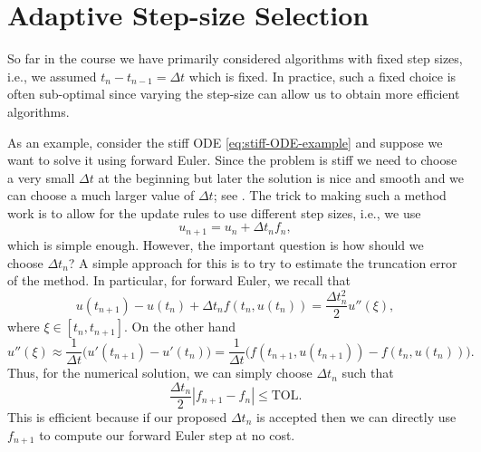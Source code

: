 \chapter{Adaptive Step-size Selection}

So far in the course we have primarily considered algorithms with 
fixed step sizes, i.e., we assumed $t_{n} - t_{n-1} = \Delta t$ 
which is fixed. In practice, such a fixed choice is often sub-optimal 
since varying the step-size can allow us to obtain more 
efficient algorithms. 

As an example, consider the stiff ODE \eqref{eq:stiff-ODE-example}
and suppose we want to solve it using forward Euler. Since the problem 
is stiff we need to choose a very small $\Delta t$ at the beginning 
but later the solution is nice and smooth and we can choose a much 
larger value of $\Delta t$; see .
The trick to making such a method work is to allow for 
the update rules to use different step sizes, i.e., we use 
\begin{equation*}
    u_{n+1} = u_n + \Delta t_n f_n,
\end{equation*}
which is simple enough. However, the important question is 
how should we choose $\Delta t_n$? A simple approach for 
this is to try to estimate the truncation error of the 
method. In particular, for forward Euler, we recall that 
\begin{equation*}
    u(t_{n+1}) - u(t_n) + \Delta t_n f(t_n, u(t_n)) 
    = \frac{ \Delta t_n^2}{2} u''(\xi),
\end{equation*}
where $\xi \in [t_n, t_{n+1}]$.
On the other hand 
\begin{equation*}
    u''(\xi) \approx \frac{1}{\Delta t} 
    \Big( u'(t_{n+1}) - u'(t_n) \Big)
    = \frac{1}{\Delta t} \Big(
    f(t_{n+1}, u(t_{n+1})) - f(t_{n}, u(t_{n})) \Big). 
\end{equation*}
Thus, for the numerical solution, we can simply choose $\Delta t_n$ 
such that 
\begin{equation}\label{eq:l13-disp2}
    \frac{ \Delta t_n }{2} | f_{n+1} - f_n| \le \text{TOL}.
\end{equation}
This is efficient because if our proposed $\Delta t_n$ is accepted 
then we can directly use $f_{n+1}$ to compute our forward Euler step 
at no cost. 


